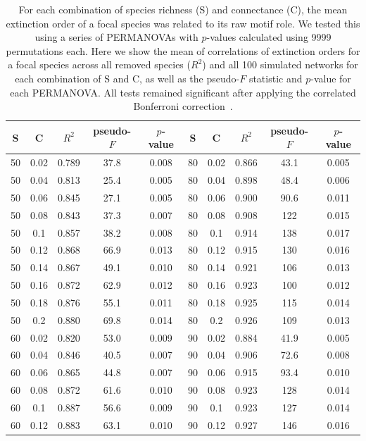 \documentclass[12pt]{article}
\begin{document}
		\begin{table}[hb!]
			\caption{For each combination of species richness (S) and connectance (C), the mean extinction order of a focal species was related to its raw motif role. We tested this using a series of PERMANOVAs with $p$-values calculated using 9999 permutations each. Here we show the mean of correlations of extinction orders for a focal species across all removed species ($R^2$) and all 100 simulated networks for each combination of S and C, as well as the pseudo-$F$ statistic and $p$-value for each PERMANOVA. All tests remained significant after applying the correlated Bonferroni correction~\citep{Drezner2016}.}
			\label{permtable_count}
			\begin{tabular}{c c | c | c c ||c c | c | c c |}
				S	&	C	&	$R^2$	&	pseudo-$F$	&	$p$-value	&	S	&	C &	$R^2$	&	pseudo-$F$	&	$p$-value\\ 
				\hline
				50&0.02&0.789&37.8&0.008	&	80&0.02&0.866&43.1&0.005\\
                50&0.04&0.813&25.4&0.005	&	80&0.04&0.898&48.4&0.006\\
                50&0.06&0.845&27.1&0.005	&	80&0.06&0.900&90.6&0.011\\
                50&0.08&0.843&37.3&0.007	&	80&0.08&0.908&122&0.015\\
                50&0.1&0.857&38.2&0.008	&	80&0.1&0.914&138&0.017\\
                50&0.12&0.868&66.9&0.013	&	80&0.12&0.915&130&0.016\\
                50&0.14&0.867&49.1&0.010	&	80&0.14&0.921&106&0.013\\
                50&0.16&0.872&62.9&0.012	&	80&0.16&0.923&100&0.012\\
                50&0.18&0.876&55.1&0.011	&	80&0.18&0.925&115&0.014\\
                50&0.2&0.880&69.8&0.014	&	80&0.2&0.926&109&0.013\\
                60&0.02&0.820&53.0&0.009	&	90&0.02&0.884&41.9&0.005\\
                60&0.04&0.846&40.5&0.007	&	90&0.04&0.906&72.6&0.008\\
                60&0.06&0.865&44.8&0.007	&	90&0.06&0.915&93.4&0.010\\
                60&0.08&0.872&61.6&0.010	&	90&0.08&0.923&128&0.014\\
                60&0.1&0.887&56.6&0.009	&	90&0.1&0.923&127&0.014\\
                60&0.12&0.883&63.1&0.010	&	90&0.12&0.927&146&0.016\\

\end{tabular}
\end{table}
\end{document}
